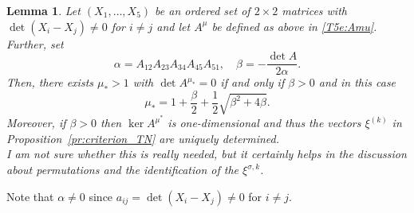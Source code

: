 \documentclass[titlepage]{amsart}
\numberwithin{equation}{section}
\theoremstyle{plain}
\newtheorem{lemma}[equation]{Lemma}
\theoremstyle{definition}
\theoremstyle{remark}
\begin{document}
\begin{lemma}\label{T5l:mu}
Let $(X_1,\dots,X_5)$ be an ordered set of $2\times 2$ matrices
  with $\det (X_i - X_j) \ne 0$ for $i \ne j$ and let $A^\mu$ be defined as above in \eqref{T5e:Amu}. Further, set
\begin{equation}\label{T5e:alphabeta}
\alpha=A_{12} A_{23} A_{34} A_{45} A_{51},\quad \beta=-\frac{\det A}{2\alpha}.   
\end{equation}
Then, there exists $\mu_*>1$ with $\det A^{\mu_*}=0$ if and only if $\beta>0$ and in this case
\begin{equation}\label{T5e:mu*}
\mu_*=1+\frac{\beta}{2}+\frac{1}{2}\sqrt{\beta^2+4\beta}.
\end{equation}
 Moreover, if $\beta > 0$ then $\ker A^{\mu^*}$ is one-dimensional and thus the vectors $\xi^{(k)}$ in Proposition~\ref{pr:criterion_TN}
are uniquely determined.\\
I am not sure whether this is really needed, but it certainly helps in the discussion about permutations and the identification of the $\xi^{\sigma, k}$.
\end{lemma}

 Note that $\alpha \ne 0$ since $a_{ij} = \det(X_i-X_j) \ne 0$ for $i \ne j$.
 
\end{document}
